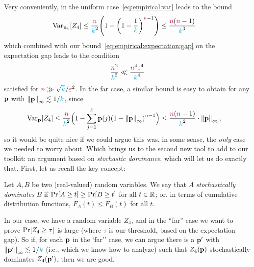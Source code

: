 Very conveniently, in the uniform case~\cref{eq:empirical:var} leads to the bound
\begin{align}
  \label{eq:empirical:var:unif}
  \Var_{\uniform_\ab}[Z_4] 
  &\leq \frac{\ns}{\ab^2} \Paren{ 1 - \Paren{1-\frac{1}{\ab}}^{\ns-1} } \leq \frac{\ns(\ns-1)}{\ab^3}
\end{align}
which combined with our bound~\cref{eq:empirical:expectation:gap} on the expectation gap leads to the condition
\[
    \frac{{\textcolor{purple}{n}}^2}{{\textcolor{cyan}{k}}^3} \ll \frac{{\textcolor{purple}{n}}^4\textcolor{red}{\varepsilon}^4}{{\textcolor{cyan}{k}}^4}
\]
satisfied for ${\textcolor{purple}{n}} \gg \sqrt{{\textcolor{cyan}{k}}}/\textcolor{red}{\varepsilon}^2$. In the far case, a similar bound is easy to obtain for any $\mathbf{p}$ with $\norminf{\p} \lesssim 1/\ab$, since
\begin{align}
  \label{eq:empirical:var:lowinfty}
  \Var_{\p}[Z_4] 
  &\leq \frac{\ns}{\ab^2} \Big({ 1 - \sum_{j=1}^\ab \p(j) \Paren{1-\norminf{\p}}^{\ns-1} } \Big)
   \leq \frac{\ns(\ns-1)}{\ab^2}\cdot \norminf{\p}\,,
\end{align}
so it would be quite nice if we could argue this was, in some sense, the \emph{only} case we needed to worry about. Which brings us to the second new tool to add to our toolkit: an argument based on \emph{stochastic dominance}, which will let us do exactly that. First, let us recall the key concept:
\begin{definition}
Let $A,B$ be two (real-valued) random variables. We say that $A$ \emph{stochastically dominates} $B$ if $\bPr{A \geq t} \geq \bPr{B \geq t}$ for all $t\in\mathbb{R}$; or, in terms of cumulative distribution functions, $F_A(t) \leq F_B(t)$ for all $t$.
\end{definition}
In our case, we have a random variable $Z_4$, and in the ``far'' case we want to prove $\bPr{Z_4 \geq \tau}$ is large (where $\tau$ is our threshold, based on the expectation gap). So if, for each $\mathbf{p}$ in the `far'' case, we can argue there is a $\mathbf{p}'$  with $\norminf{\p'} \lesssim 1/\ab$ (i.e., which we know how to analyze) such that $Z_4(\mathbf{p})$ stochastically dominates $Z_4(\mathbf{p}')$, then we are good.

